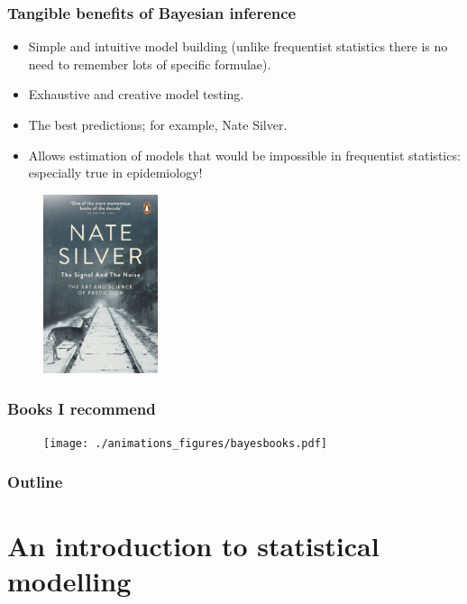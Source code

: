 \documentclass[handout]{beamer}
\begin{document}
\begin{frame}
	\frametitle{Tangible benefits of Bayesian inference}
	
	\begin{itemize}
		\item<2-> Simple and intuitive model building (unlike frequentist statistics there is no need to remember lots of specific formulae).
		\item<3-> Exhaustive and creative model testing.
		\item<4-> The best predictions; for example, Nate Silver.
		\item<5-> Allows estimation of models that would be impossible in frequentist statistics: especially true in epidemiology!
	\end{itemize}
	
	\begin{figure}[ht]
		\centerline{\includegraphics[width=0.3\textwidth]{./animations_figures/nateSilver.jpg}}
	\end{figure}
	
\end{frame}

\begin{frame}
	\frametitle{Books I recommend}
	
	\begin{figure}[ht]
		\centerline{\texttt{[image: ./animations\_figures/bayesbooks.pdf]}}
	\end{figure}
\end{frame}

\begin{frame}
	\frametitle{Outline}
	\tableofcontents
\end{frame}

\section{An introduction to statistical modelling}
\frame{\tableofcontents[currentsection]}
\end{document}
